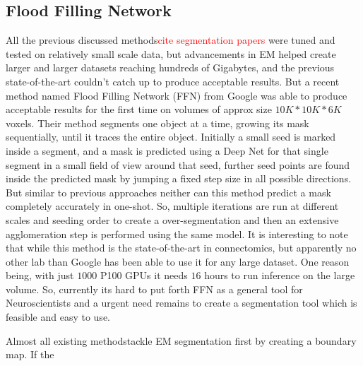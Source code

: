\subsection{Flood Filling Network}
All the previous discussed methods\textcolor{red}{cite segmentation papers}  were tuned and tested on relatively small scale data, but advancements in EM helped create larger and larger datasets reaching hundreds of Gigabytes, and the previous state-of-the-art couldn't catch up to produce acceptable results. But a recent method named Flood Filling Network (FFN) \cite{Januszewski2018FFN} from Google was able to produce acceptable results for the first time on volumes of approx size $10K*10K*6K$ voxels.
Their method segments one object at a time, growing its mask sequentially, until it traces the entire object. Initially a small seed is marked inside a segment, and a mask is predicted using a Deep Net for that single segment in a small field of view around that seed, further seed points are found inside the predicted mask by jumping a fixed step size in all possible directions.
But similar to previous approaches neither can this method predict a mask completely accurately in one-shot. So, multiple iterations are run at different scales and seeding order to create a over-segmentation and then an extensive agglomeration step is performed using the same model.
It is interesting to note that while this method is the state-of-the-art in connectomics, but apparently no other lab than Google has been able to use it for any large dataset. One reason being, with just $1000$ P100 GPUs it needs $16$ hours to run inference on the large volume\cite{Januszewski2017FFN}. So, currently its hard to put forth FFN as a general tool for Neuroscientists and a urgent need remains to create a segmentation tool which is feasible and easy to use.

Almost all existing methodstackle EM segmentation first by creating a boundary map. If the  